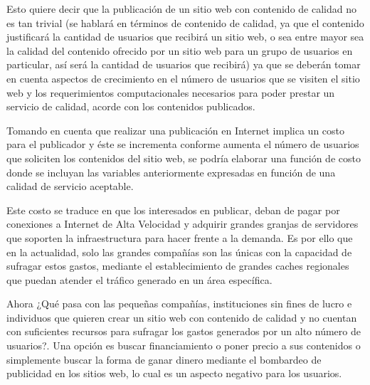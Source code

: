 Esto quiere decir que la publicación de un sitio web con contenido de calidad no es tan trivial (se hablará en términos de contenido de calidad, ya que el contenido justificará la cantidad de usuarios que recibirá un sitio web, o sea entre mayor sea la calidad del contenido ofrecido por un sitio web para un grupo de usuarios en particular, así será la cantidad de usuarios que recibirá) ya que se deberán tomar en cuenta aspectos de crecimiento en el número de usuarios que se visiten el sitio web y los requerimientos computacionales necesarios para poder prestar un servicio de calidad, acorde con los contenidos publicados.

Tomando en cuenta que realizar una publicación en Internet implica un costo para el publicador y éste se incrementa conforme aumenta el número de usuarios que soliciten los contenidos del sitio web, se podría elaborar una función de costo donde se incluyan las variables anteriormente expresadas en función de una calidad de servicio aceptable.

Este costo se traduce en que los interesados en publicar, deban de pagar por conexiones a Internet de Alta Velocidad y adquirir grandes granjas de servidores que soporten la infraestructura para hacer frente a la demanda. Es por ello que en la actualidad, solo las grandes compañías son las únicas con la capacidad de sufragar estos gastos, mediante el establecimiento de grandes caches regionales que puedan atender el tráfico generado en un área específica.

Ahora ¿Qué pasa con las pequeñas compañías, instituciones sin fines de lucro e individuos que quieren crear un sitio web con contenido de calidad y no cuentan con suficientes recursos para sufragar los gastos generados por un alto número de usuarios?. Una opción es buscar financiamiento o poner precio a sus contenidos o simplemente buscar la forma de ganar dinero mediante el bombardeo de publicidad en los sitios web, lo cual es un aspecto negativo para los usuarios.

